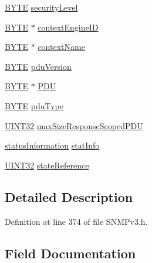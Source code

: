\begin{DoxyCompactItemize}
\hyperlink{_generic_type_defs_8h_a4ae1dab0fb4b072a66584546209e7d58}{B\+Y\+T\+E} \hyperlink{struct_msg_proc_mod_prepare_data_elements_a9314d7b462ce4cc59202ed48fcdd9945}{security\+Level}
\item 
\hyperlink{_generic_type_defs_8h_a4ae1dab0fb4b072a66584546209e7d58}{B\+Y\+T\+E} $\ast$ \hyperlink{struct_msg_proc_mod_prepare_data_elements_aa75baf2d001f5d5ac415eed279fd6e85}{context\+Engine\+I\+D}
\item 
\hyperlink{_generic_type_defs_8h_a4ae1dab0fb4b072a66584546209e7d58}{B\+Y\+T\+E} $\ast$ \hyperlink{struct_msg_proc_mod_prepare_data_elements_af55ce5882ccbc8435fb33f1020c74550}{context\+Name}
\item 
\hyperlink{_generic_type_defs_8h_a4ae1dab0fb4b072a66584546209e7d58}{B\+Y\+T\+E} \hyperlink{struct_msg_proc_mod_prepare_data_elements_a731491a51ee1a2971e5cd7d7446c1dab}{pdu\+Version}
\item 
\hyperlink{_generic_type_defs_8h_a4ae1dab0fb4b072a66584546209e7d58}{B\+Y\+T\+E} $\ast$ \hyperlink{struct_msg_proc_mod_prepare_data_elements_abf0d7b0afb4ebcedb2a0138c9b14fdb5}{P\+D\+U}
\item 
\hyperlink{_generic_type_defs_8h_a4ae1dab0fb4b072a66584546209e7d58}{B\+Y\+T\+E} \hyperlink{struct_msg_proc_mod_prepare_data_elements_ad106adfabb3dc56cdc2d52727d9771c5}{pdu\+Type}
\item 
\hyperlink{_generic_type_defs_8h_a1720f33f59b583f0c2ed071815623a86}{U\+I\+N\+T32} \hyperlink{struct_msg_proc_mod_prepare_data_elements_a4d30d65bba90a70a4606761f5ff3d17d}{max\+Size\+Response\+Scoped\+P\+D\+U}
\item 
\hyperlink{_s_n_m_pv3_8h_a074d8e7ed4175677b89b7c8d5d45e294}{status\+Information} \hyperlink{struct_msg_proc_mod_prepare_data_elements_ad07540e94950d793173ffdb63915b853}{stat\+Info}
\item 
\hyperlink{_generic_type_defs_8h_a1720f33f59b583f0c2ed071815623a86}{U\+I\+N\+T32} \hyperlink{struct_msg_proc_mod_prepare_data_elements_a62eef1407cf307242b77d068071cafeb}{state\+Reference}
\end{DoxyCompactItemize}


\subsection{Detailed Description}


Definition at line 374 of file S\+N\+M\+Pv3.\+h.



\subsection{Field Documentation}
\hypertarget{struct_msg_proc_mod_prepare_data_elements_aa75baf2d001f5d5ac415eed279fd6e85}{}
